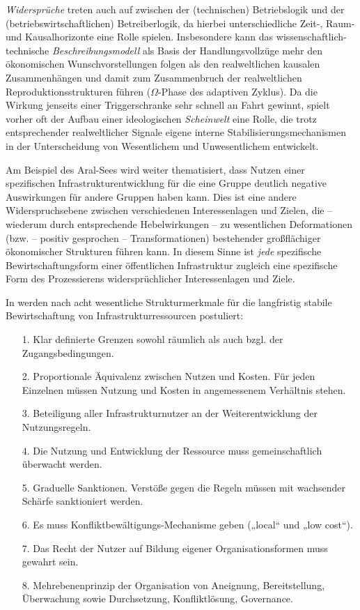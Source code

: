 \documentclass[11pt,a4paper]{article}
\begin{document}
\emph{Widersprüche} treten auch auf zwischen der (technischen) Betriebslogik
und der (betriebswirtschaftlichen) Betreiberlogik, da hierbei unterschiedliche
Zeit-, Raum- und Kausalhorizonte eine Rolle spielen. Insbesondere kann das
wissenschaftlich-technische \emph{Beschreibungsmodell} als Basis der
Handlungsvollzüge mehr den ökonomischen Wunschvorstellungen folgen als den
realweltlichen kausalen Zusammenhängen und damit zum Zusammenbruch der
realweltlichen Reproduktionsstrukturen führen ($\Omega$-Phase des adaptiven
Zyklus). Da die Wirkung jenseits einer Triggerschranke sehr schnell an Fahrt
gewinnt, spielt vorher oft der Aufbau einer ideologischen \emph{Scheinwelt}
eine Rolle, die trotz entsprechender realweltlicher Signale eigene interne
Stabilisierungsmechanismen in der Unterscheidung von Wesentlichem und
Unwesentlichem entwickelt.

Am Beispiel des Aral-Sees wird weiter thematisiert, dass Nutzen einer
spezifischen Infrastrukturentwicklung für die eine Gruppe deutlich negative
Auswirkungen für andere Gruppen haben kann. Dies ist eine andere
Widerspruchsebene zwischen verschiedenen Interessenlagen und Zielen, die --
wiederum durch entsprechende Hebelwirkungen -- zu wesentlichen Deformationen
(bzw. -- positiv gesprochen -- Transformationen) bestehender großflächiger
ökonomischer Strukturen führen kann. In diesem Sinne ist \emph{jede}
spezifische Bewirtschaftungsform einer öffentlichen Infrastruktur zugleich
eine spezifische Form des Prozessierens widersprüchlicher Interessenlagen und
Ziele.

In \cite{Anderies2004} werden nach \cite{Ostrom1990} acht wesentliche
Strukturmerkmale für die langfristig stabile Bewirtschaftung von
Infrastrukturressourcen postuliert:
\begin{itemize}[noitemsep]
\item[1.] Klar definierte Grenzen sowohl räumlich als auch bzgl. der
  Zugangsbedingungen.
\item[2.] Proportionale Äquivalenz zwischen Nutzen und Kosten. Für jeden
  Einzelnen müssen Nutzung und Kosten in angemessenem Verhältnis stehen.
\item[3.] Beteiligung aller Infrastrukturnutzer an der Weiterentwicklung der
  Nutzungsregeln.
\item[4.] Die Nutzung und Entwicklung der Ressource muss gemeinschaftlich
  überwacht werden.
\item[5.] Graduelle Sanktionen. Verstöße gegen die Regeln müssen mit
  wachsender Schärfe sanktioniert werden.
\item[6.] Es muss Konfliktbewältigungs-Mechanisme geben („local“ und „low
  cost“).
\item[7.] Das Recht der Nutzer auf Bildung eigener Organisationsformen muss
  gewahrt sein.
\item[8.] Mehrebenenprinzip der Organisation von Aneignung, Bereitstellung,
  Überwachung sowie Durchsetzung, Konfliktlösung, Governance.
\end{itemize}
\end{document}
